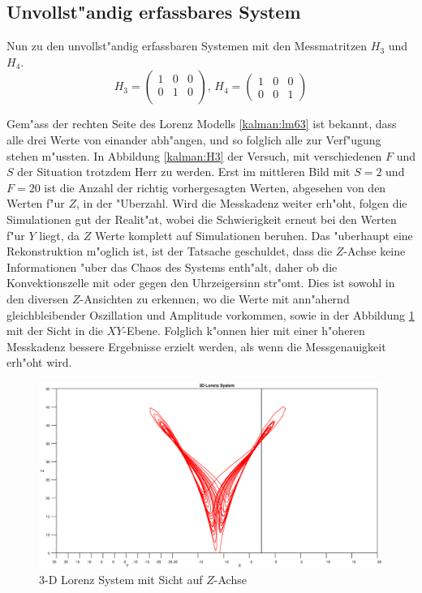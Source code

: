 \begin{refsection}
\subsection{Unvollst"andig erfassbares System}
Nun zu den unvollst"andig erfassbaren Systemen mit den Messmatritzen $H_{3}$ und $H_{4}$.
\[H_{3}=\begin{pmatrix}
1 & 0 & 0 \\ 
0 & 1 & 0 \\ 
\end{pmatrix} 
\text{, }
H_{4}=\begin{pmatrix}
1 & 0 & 0 \\ 
0 & 0 & 1
\end{pmatrix}\]

Gem"ass der rechten Seite des Lorenz Modells \eqref{kalman:lm63} ist bekannt, dass alle drei Werte von einander abh"angen, und so folglich alle zur Verf"ugung stehen m"ussten. In Abbildung \ref{kalman:H3} der Versuch, mit verschiedenen $F$ und $S$ der Situation trotzdem Herr zu werden. Erst im mittleren Bild mit $S=2$ und $F=20$ ist die Anzahl der richtig vorhergesagten Werten, abgesehen von den Werten f"ur $Z$, in der "Uberzahl. Wird die Messkadenz weiter erh"oht, folgen die Simulationen gut der Realit"at, wobei die Schwierigkeit erneut bei den Werten f"ur $Y$ liegt, da $Z$ Werte komplett auf Simulationen beruhen. Das "uberhaupt eine Rekonstruktion m"oglich ist, ist der Tatsache geschuldet, dass die $Z$-Achse keine Informationen "uber das Chaos des Systems enth"alt, daher ob die Konvektionszelle mit oder gegen den Uhrzeigersinn str"omt. Dies ist sowohl in den diversen $Z$-Ansichten zu erkennen, wo die Werte mit ann"ahernd gleichbleibender Oszillation und Amplitude vorkommen, sowie in der Abbildung \ref{kalman:zview} mit der Sicht in die $XY$-Ebene.
Folglich k"onnen hier mit einer h"oheren Messkadenz bessere Ergebnisse erzielt werden, als wenn die Messgenauigkeit erh"oht wird.

\begin{figure}
\centering
\includegraphics[width=\hsize]{kalman/figures/zview.eps}
\caption{3-D Lorenz System mit Sicht auf $Z$-Achse}
\label{kalman:zview}
\end{figure}


\end{refsection}
